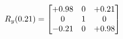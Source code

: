 \documentclass[preview]{standalone}
\begin{document}
\begin{align*}
\special{dvisvgm:raw <g id='unique000'>}R_{y}(0.21) = \begin{bmatrix}+0.98 & 0 & +0.21 \\0 & 1 & 0 \\-0.21 & 0 & +0.98\end{bmatrix}\special{dvisvgm:raw </g>}
\end{align*}
\end{document}
